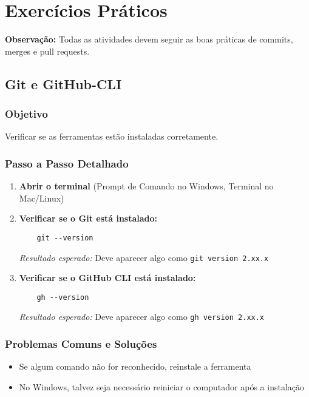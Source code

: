 \chapter{Exercícios Práticos}

\textbf{Observação:} Todas as atividades devem seguir as boas práticas de commits, merges e pull requests.

\section{Git e GitHub-CLI}

\subsection{Objetivo}
Verificar se as ferramentas estão instaladas corretamente.

\subsection{Passo a Passo Detalhado}

\begin{enumerate}
    \item \textbf{Abrir o terminal} (Prompt de Comando no Windows, Terminal no Mac/Linux)
    
    \item \textbf{Verificar se o Git está instalado:}
    \begin{verbatim}
    git --version
    \end{verbatim}
    \textit{Resultado esperado:} Deve aparecer algo como \texttt{git version 2.xx.x}
    
    \item \textbf{Verificar se o GitHub CLI está instalado:}
    \begin{verbatim}
    gh --version
    \end{verbatim}
    \textit{Resultado esperado:} Deve aparecer algo como \texttt{gh version 2.xx.x}
\end{enumerate}

\subsection{Problemas Comuns e Soluções}
\begin{itemize}
    \item Se algum comando não for reconhecido, reinstale a ferramenta
    \item No Windows, talvez seja necessário reiniciar o computador após a instalação
\end{itemize}

